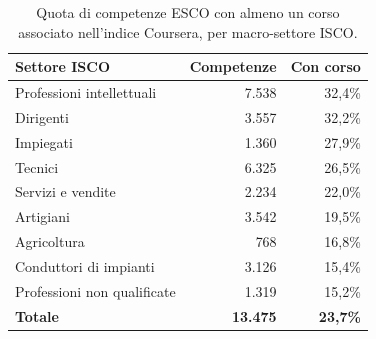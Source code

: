 \begin{table}[htbp]
  \centering
  \caption{Quota di competenze ESCO con almeno un corso associato
           nell'indice Coursera, per macro-settore ISCO.}
  \label{tab:copertura-corsi}
  \begin{tabular}{lrr}
    \toprule
    \textbf{Settore ISCO} & \textbf{Competenze} & \textbf{Con corso} \\
    \midrule
    Professioni intellettuali    & 7.538  & 32,4\% \\
    Dirigenti                    & 3.557  & 32,2\% \\
    Impiegati                    & 1.360  & 27,9\% \\
    Tecnici                      & 6.325  & 26,5\% \\
    Servizi e vendite            & 2.234  & 22,0\% \\
    Artigiani                    & 3.542  & 19,5\% \\
    Agricoltura                  &   768  & 16,8\% \\
    Conduttori di impianti       & 3.126  & 15,4\% \\
    Professioni non qualificate  & 1.319  & 15,2\% \\
    \midrule
    \textbf{Totale}              & \textbf{13.475} & \textbf{23,7\%} \\
    \bottomrule
  \end{tabular}
\end{table}
